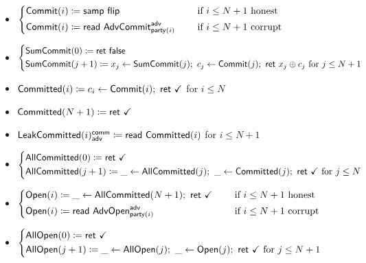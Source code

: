 \begin{itemize}
\item {\color{blue} $\begin{cases*} \Commit(i) \coloneqq \samp{\flip} & \hspace{10pt} \text{if $i \leq N+1$ honest} \\ \Commit(i) \coloneqq \read{\AdvCommit^\adv_{\party(i)}} & \hspace{10pt} \text{if $i \leq N+1$ corrupt} \end{cases*}$}
\item {\color{blue} $\begin{cases*} \SumCommit(0) \coloneqq \ret{\false} \\ \SumCommit(j+1) \coloneqq x_j \leftarrow \SumCommit(j); \ c_j \leftarrow \Commit(j); \ \ret{x_j \oplus c_j} \text{ for $j \leq N+1$} \end{cases*}$}
\item {\color{magenta} $\mathsf{Committed}(i) \coloneqq c_i \leftarrow \mathsf{Commit}(i); \ \mathsf{ret} \ \checkmark$ for $i \leq N$}
\item {\color{magenta} $\mathsf{Committed}(N+1) \coloneqq \mathsf{ret} \ \checkmark$}
\item {\color{magenta} $\mathsf{LeakCommitted}(i)^{\mathsf{comm}}_{\mathsf{adv}} \coloneqq \mathsf{read} \ \mathsf{Committed}(i)$ for $i \leq N+1$}
\item {\color{magenta} $\begin{cases*} \AllCommitted(0) \coloneqq \ret{\checkmark} \\ \AllCommitted(j+1) \coloneqq \_ \leftarrow \AllCommitted(j); \ \_ \leftarrow \Committed(j); \ \ret{\checkmark} \text{ for $j \leq N$} \end{cases*}$}
\item {\color{teal} $\begin{cases*} \Open(i) \coloneqq \_ \leftarrow \AllCommitted(N+1); \ \ret{\checkmark} & \hspace{10pt} \text{if $i \leq N+1$ honest} \\ \Open(i) \coloneqq \read{\AdvOpen^\adv_{\party(i)}} & \hspace{10pt} \text{if $i \leq N+1$ corrupt} \end{cases*}$}
\item {\color{teal} $\begin{cases*} \AllOpen(0) \coloneqq \ret{\checkmark} \\ \AllOpen(j+1) \coloneqq \_ \leftarrow \AllOpen(j); \ \_ \leftarrow \Open(j); \ \ret{\checkmark} \text{ for $j \leq N+1$} \end{cases*}$}

\end{itemize}
